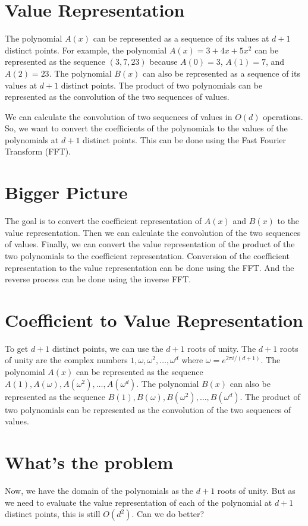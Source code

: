 \documentclass[28]{report}
\begin{document}
\section{Value  Representation}

The polynomial \(A(x)\) can be represented as a sequence of its values at \(d+1\) distinct points. For example, the polynomial \(A(x) = 3 + 4x + 5x^2\) can be represented as the sequence \((3, 7, 23)\) because \(A(0) = 3\), \(A(1) = 7\), and \(A(2) = 23\). The polynomial \(B(x)\) can also be represented as a sequence of its values at \(d+1\) distinct points. The product of two polynomials can be represented as the convolution of the two sequences of values.

We can calculate the convolution of two sequences of values in \(O(d)\) operations. So, we want to convert the coefficients of the polynomials to the values of the polynomials at \(d+1\) distinct points. This can be done using the Fast Fourier Transform (FFT).
\section{Bigger Picture} 
The goal is to convert the coefficient representation of $A(x) $ and $B(x)$ to the value representation. Then we can calculate the convolution of the two sequences of values. Finally, we can convert the value representation of the product of the two polynomials to the coefficient representation. \newline
Conversion of the coefficient representation to the value representation can be done using the FFT. And the reverse process can be done using the inverse FFT. \newline

\section{Coefficient to Value Representation}
To get \(d+1\) distinct points, we can use the \(d+1\) roots of unity. The \(d+1\) roots of unity are the complex numbers \(1, \omega, \omega^2, \ldots, \omega^d\) where \(\omega = e^{2\pi i/(d+1)}\). The polynomial \(A(x)\) can be represented as the sequence \(A(1), A(\omega), A(\omega^2), \ldots, A(\omega^d)\). The polynomial \(B(x)\) can also be represented as the sequence \(B(1), B(\omega), B(\omega^2), \ldots, B(\omega^d)\). The product of two polynomials can be represented as the convolution of the two sequences of values.


\section{What's the problem}
Now, we have the domain of the polynomials as the \(d+1\) roots of unity. But as we need to evaluate the value representation of each of the polynomial at \(d+1\) distinct points, this is still \(O(d^2)\). Can we do better? 
\end{document}
